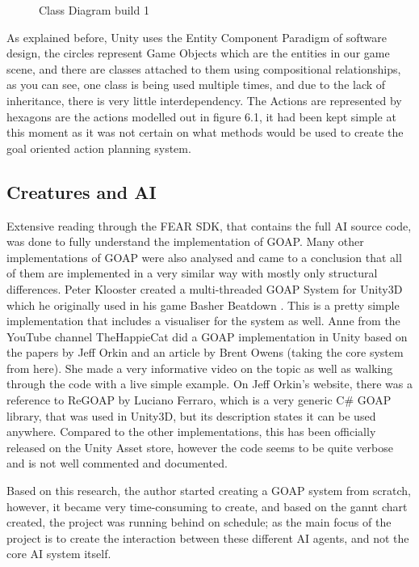 \documentclass[11pt]{report}
\begin{document}
\begin{figure}[H]
    \centering
    \caption{Class Diagram build 1}
\end{figure}

As explained before, Unity uses the Entity Component Paradigm of software design, the circles represent Game Objects which are the entities in our game scene, and there are classes attached to them using compositional relationships, as you can see, one class is being used multiple times, and due to the lack of inheritance, there is very little interdependency. 
The Actions are represented by hexagons are the actions modelled out in figure 6.1, it had been kept simple at this moment as it was not certain on what methods would be used to create the goal oriented action planning system.

\subsection{Creatures and AI}
Extensive reading through the FEAR SDK\cite{fearSDK}, that contains the full AI source code, was done to fully understand the implementation of GOAP.
Many other implementations of GOAP were also analysed and came to a conclusion that all of them are implemented in a very similar way with mostly only structural differences. 
Peter Klooster created a multi-threaded GOAP System for Unity3D which he originally used in his game Basher Beatdown \cite{basherGoap}. This is a pretty simple implementation that includes a visualiser for the system as well.
Anne from the YouTube channel TheHappieCat did a GOAP implementation in Unity \cite{happieGoapVideo} based on the papers by Jeff Orkin and an article by Brent Owens \cite{brentOwensGoap} (taking the core system from here). She made a very informative video on the topic as well as walking through the code with a live simple example.
On Jeff Orkin's website, there was a reference to ReGOAP by Luciano Ferraro, which is a very generic C\# GOAP library, that was used in Unity3D, but its description states it can be used anywhere. Compared to the other implementations, this has been officially released on the Unity Asset store, however the code seems to be quite verbose and is not well commented and documented.

Based on this research, the author started creating a GOAP system from scratch, however, it became very time-consuming to create, and based on the gannt chart created, the project was running behind on schedule; as the main focus of the project is to create the interaction between these different AI agents, and not the core AI system itself.
\end{document}

